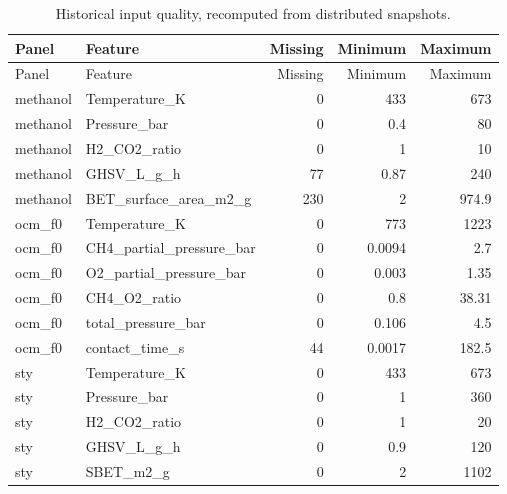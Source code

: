 \small\begin{longtable}{llrrr}
\caption{Historical input quality, recomputed from distributed snapshots.}\\
\toprule Panel & Feature & Missing & Minimum & Maximum \\ \midrule\endfirsthead
\toprule Panel & Feature & Missing & Minimum & Maximum \\ \midrule\endhead
\bottomrule\endfoot
methanol & Temperature\_K & 0 & 433 & 673 \\
methanol & Pressure\_bar & 0 & 0.4 & 80 \\
methanol & H2\_CO2\_ratio & 0 & 1 & 10 \\
methanol & GHSV\_L\_g\_h & 77 & 0.87 & 240 \\
methanol & BET\_surface\_area\_m2\_g & 230 & 2 & 974.9 \\
ocm\_f0 & Temperature\_K & 0 & 773 & 1223 \\
ocm\_f0 & CH4\_partial\_pressure\_bar & 0 & 0.0094 & 2.7 \\
ocm\_f0 & O2\_partial\_pressure\_bar & 0 & 0.003 & 1.35 \\
ocm\_f0 & CH4\_O2\_ratio & 0 & 0.8 & 38.31 \\
ocm\_f0 & total\_pressure\_bar & 0 & 0.106 & 4.5 \\
ocm\_f0 & contact\_time\_s & 44 & 0.0017 & 182.5 \\
sty & Temperature\_K & 0 & 433 & 673 \\
sty & Pressure\_bar & 0 & 1 & 360 \\
sty & H2\_CO2\_ratio & 0 & 1 & 20 \\
sty & GHSV\_L\_g\_h & 0 & 0.9 & 120 \\
sty & SBET\_m2\_g & 0 & 2 & 1102 \\
\end{longtable}\normalsize